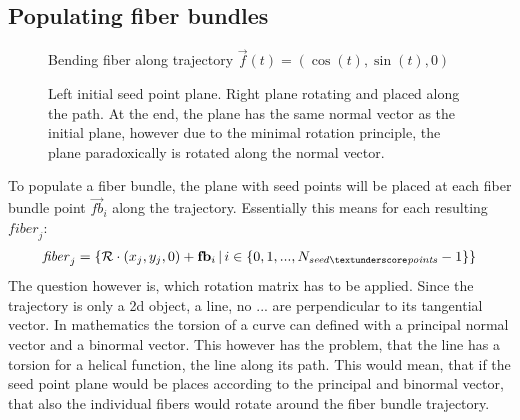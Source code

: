 \subsection{Populating fiber bundles}\label{sec:fillBundle}
% 
\begin{figure}[!t]
    \centering
	\caption[Bending filled fiber bundle]{Bending fiber along trajectory $\vec{f}(t) = \left(\cos(t), \sin(t), 0 \right)$ }
	\label{fig:bendingFiberBundle}
\end{figure}
% 
\begin{figure}[!t]
    \centering
    \setlength{\tikzwidth}{0.75\textwidth}
	\caption[]{Left initial seed point plane. Right plane rotating and placed along the path. At the end, the plane has the same normal vector as the initial plane, however due to the minimal rotation principle, the plane paradoxically is rotated along the normal vector.}
	\label{fig:torsion}
\end{figure}
% 
To populate a fiber bundle, the plane with seed points will be placed at each fiber bundle point $\vec{fb}_i$ along the trajectory.
Essentially this means for each resulting $\mathit{fiber}_j$:
\begin{align}
    \mathit{fiber}_j = \left\{ \mat{R} \cdot (x_j, y_j, 0) + \vec{fb}_i \, | \, i \in \{0,1,...,N_{\mathit{seed\tu points}}-1\}\right\}
\end{align}
The question however is, which rotation matrix has to be applied.
Since the trajectory is only a 2d object, \ie{} a line, no ... are perpendicular to its tangential vector.
In mathematics the torsion of a curve can defined with a principal normal vector and a binormal vector.
This however has the problem, that the line has a torsion for a helical function, \ie{} the line  along its path.
This would mean, that if the seed point plane would be places according to the principal and binormal vector, that also the individual fibers would rotate around the fiber bundle trajectory.

